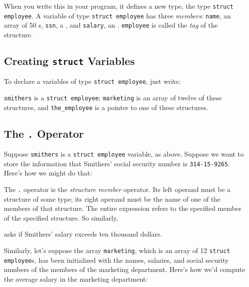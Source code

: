 When you write this in your program, it defines a new type, the type
{\tt struct employee}.  A variable of type {\tt struct employee} has
three {\em members}\/:  {\tt name}, an array of 50 \chr s, {\tt ssn}, a
\longint, and {\tt salary}, an \int.  
{\tt employee} is called the {\em tag}\/ of the structure.

\subsection{Creating {\tt struct} Variables}

To declare a variables of type {\tt struct employee}, just write:

\begin{flushleft}
\verb% struct employee smithers, marketing[12], *the_employee;% 
\end{flushleft}

{\tt smithers} is a {\tt struct employee}; {\tt marketing} is an array
of twelve of these structures, and {\tt the\_employee} is a pointer to
one of these structures.

\subsection{The {\tt .} Operator}

Suppose {\tt smithers} is a {\tt struct employee} variable, as above.
Suppose we want to store the information that Smithers' social security
number is {\tt 314-15-9265}.  Here's how we might do that:

\begin{flushleft}
\verb% smithers.ssn = 314159265; %
\end{flushleft}

The {\tt .} operator is the {\em structure member}\/ operator.  Its left
operand must be a structure of some type; its right operand must be the
name of one of the members of that structure.  The entire expression
refers to the specified member of the specified structure.  So
similarly, 

\begin{flushleft}
\verb% if ( smithers.salary > 10000 ) { %  \\*
\verb%   ... % 
\end{flushleft}

\noindent asks if Smithers' salary exceeds ten thousand dollars. 

Similarly, let's suppose the array {\tt marketing}, which is an array of
12 {\tt struct employee}s, has been initialized with the names,
salaries, and social security numbers of the members of the marketing
department.  Here's how we'd compute the average salary in the marketing
department:  

